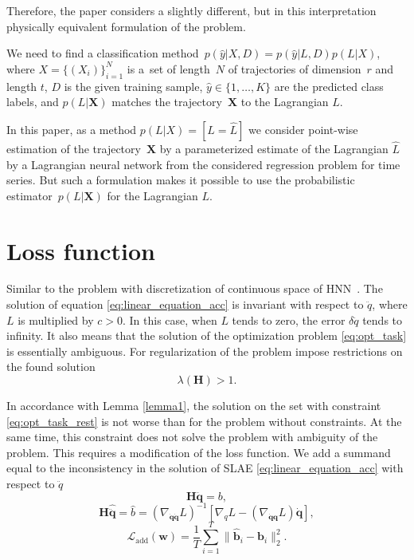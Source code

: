 \documentclass[sn-mathphys-num]{sn-jnl}
\theoremstyle{thmstylethree}
\theoremstyle{thmstyletwo}
\theoremstyle{thmstyleone}
\begin{document}
Therefore, the paper considers a slightly different, but in this interpretation physically
equivalent formulation of the problem.

We need to find a classification method~$p(\hat{y}|X, D) = p(\hat{y}|L, D)p(L|X)$, where $X = \{(X_i)\}_{i=1}^N$ is a~set of length~$N$ of trajectories of dimension~$r$ and length $t$, $D$ is the given training sample, $\hat{y} \in \{1,\dots, K\}$ are the predicted class labels, and $p(L|\mathbf{X})$ matches the trajectory~$\mathbf{X}$ to the Lagrangian $L$.

In this paper, as a method $p(L|X) = [L = \hat{L}]$ we consider point-wise estimation of the
trajectory~$\mathbf{X}$ by a parameterized estimate of the Lagrangian $\hat{L}$  by a Lagrangian neural network from the considered regression problem for time series. But such a formulation makes
it possible to use the probabilistic estimator~$p(L|\mathbf{X})$ for the Lagrangian $L$.

\section{Loss function}
Similar to the problem with discretization of continuous space of HNN~\cite{HNNnonvangrad}. The solution of equation \eqref{eq:linear_equation_acc} is invariant with respect to $\ddot{q}$, where $L$ is multiplied by $c > 0$. In this case, when $L$ tends to zero, the error $\delta\ddot{q}$ tends to infinity. It also means that the solution of the optimization problem \eqref{eq:opt_task} is essentially ambiguous. For regularization of the problem impose restrictions on the found solution
\begin{equation}\label{eq:opt_task_rest}
    \lambda \left(\mathbf{H}\right) > 1.
\end{equation}

In accordance with Lemma \ref{lemma1}, the solution on the set with constraint \eqref{eq:opt_task_rest} is not worse than for
the problem without constraints. At the same time, this constraint does not solve the problem with
ambiguity of the problem. This requires a modification of the loss function. We add a summand equal to the inconsistency in the solution of SLAE \eqref{eq:linear_equation_acc} with respect to $\ddot{q}$
\[\mathbf{H}\ddot{\mathbf{q}} = b,\]
 \[\mathbf{H}\hat{\ddot{\mathbf{q}}} = \hat{b} = \left(\nabla_{\dot{\mathbf{q}} \dot{\mathbf{q}}} L\right)^{-1}\left[\nabla_{q} L-\left(\nabla_{\dot{\mathbf{q}}\mathbf{q}} L\right) \dot{\mathbf{q}}\right], \]
\begin{equation}
    \mathcal{L}_{\text{add}}(\textbf{w}) = \frac{1}{T}\sum_{i=1}^{T} \| \mathbf{\hat{b}}_i - \mathbf{b}_i \|_2^2.
\end{equation}
\end{document}
